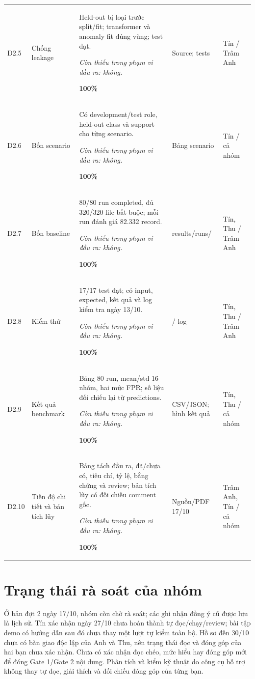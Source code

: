 \documentclass[12pt,a4paper,oneside]{report}
\begin{document}
\begin{longtable}{L{1cm}L{2.5cm}L{7.2cm}L{2.3cm}L{2.6cm}}
D2.5 & Chống leakage & Held-out bị loại trước split/fit; transformer và anomaly fit đúng vùng; test đạt.\par\textit{Còn thiếu trong phạm vi đầu ra: không.}\par\textbf{100\%} & Source; tests & Tín / Trâm Anh\\
D2.6 & Bốn scenario & Có development/test role, held-out class và support cho từng scenario.\par\textit{Còn thiếu trong phạm vi đầu ra: không.}\par\textbf{100\%} & Bảng scenario & Tín / cả nhóm\\
D2.7 & Bốn baseline & 80/80 run completed, đủ 320/320 file bắt buộc; mỗi run đánh giá 82.332 record.\par\textit{Còn thiếu trong phạm vi đầu ra: không.}\par\textbf{100\%} & results/runs/ & Tín, Thu / Trâm Anh\\
D2.8 & Kiểm thử & 17/17 test đạt; có input, expected, kết quả và log kiểm tra ngày 13/10.\par\textit{Còn thiếu trong phạm vi đầu ra: không.}\par\textbf{100\%} &  / log & Tín, Thu / Trâm Anh\\
D2.9 & Kết quả benchmark & Bảng 80 run, mean/std 16 nhóm, hai mức FPR; số liệu đối chiếu lại từ predictions.\par\textit{Còn thiếu trong phạm vi đầu ra: không.}\par\textbf{100\%} & CSV/JSON; hình kết quả & Tín, Thu / cả nhóm\\
D2.10 & Tiến độ chi tiết và bản tích lũy & Bảng tách đầu ra, đã/chưa có, tiêu chí, tỷ lệ, bằng chứng và review; bản tích lũy có đối chiếu comment gốc.\par\textit{Còn thiếu trong phạm vi đầu ra: không.}\par\textbf{100\%} & Nguồn/PDF 17/10 & Trâm Anh, Tín / cả nhóm\\
\bottomrule\end{longtable}\endgroup

\section{Trạng thái rà soát của nhóm}\label{sec:teamreview}
Ở bản đợt 2 ngày 17/10, nhóm còn chờ rà soát; các ghi nhận đồng ý cũ được lưu là lịch sử. Tín xác nhận ngày 27/10 chưa hoàn thành tự đọc/chạy/review; bài tập demo có hướng dẫn sau đó chưa thay một lượt tự kiểm toàn bộ. Hồ sơ đến 30/10 chưa có bàn giao độc lập của Anh và Thu, nên trạng thái đọc và đóng góp của hai bạn chưa xác nhận. Chưa có xác nhận đọc chéo, mức hiểu hay đóng góp mới để đóng Gate 1/Gate 2 nội dung. Phân tích và kiểm kỹ thuật do công cụ hỗ trợ không thay tự đọc, giải thích và đối chiếu đóng góp của từng bạn.
\end{document}
